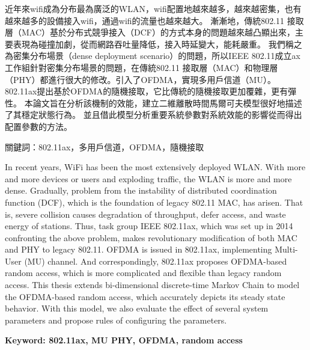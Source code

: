 \begin{abstractzh}
近年來wifi成為分布最為廣泛的WLAN，wifi配置地越來越多，越來越密集，也有越來越多的設備接入wifi，通過wifi的流量也越來越大。
漸漸地，傳統802.11 接取層（MAC）基於分布式競爭接入（DCF）的方式本身的問題越來越凸顯出來，主要表現為碰撞加劇，從而網路吞吐量降低，接入時延變大，能耗嚴重。
我們稱之為密集分布場景（dense deployment scenario）的問題，所以IEEE 802.11成立ax工作組針對密集分布場景的問題，在傳統802.11 接取層（MAC）和物理層（PHY）都進行很大的修改。引入了OFDMA，實現多用戶信道（MU）。
802.11ax提出基於OFDMA的隨機接取，它比傳統的隨機接取更加覆雜，更有彈性。
本論文旨在分析該機制的效能，建立二維離散時間馬爾可夫模型很好地描述了其穩定狀態行為。
並且借此模型分析重要系統參數對系統效能的影響從而得出配置參數的方法。

\noindent
關鍵詞：802.11ax，多用戶信道，OFDMA，隨機接取
\end{abstractzh}

\begin{abstracten}
In recent years, WiFi has been the most extensively deployed WLAN. 
With more and more devices or users and exploding traffic, the WLAN is more and more dense. 
Gradually, problem from the instability of distributed coordination function (DCF), which is the foundation of legacy 802.11 MAC, has arisen. 
That is, severe collision causes degradation of throughput, defer access, and waste energy of stations. 
Thus, task group IEEE 802.11ax, which was set up in 2014 confronting the above problem, makes revolutionary modification of both MAC and PHY to legacy 802.11. 
OFDMA is issued in 802.11ax, implementing Multi-User (MU) channel. 
And correspondingly, 802.11ax proposes OFDMA-based random access, which is more complicated and flexible than legacy random access. 
This thesis extends bi-dimensional discrete-time Markov Chain to model the OFDMA-based random access, which accurately depicts its steady state behavior. 
With this model, we also evaluate the effect of several system parameters and propose rules of configuring the parameters.



\noindent
\textbf{Keyword: 802.11ax, MU PHY, OFDMA, random access}
\end{abstracten}

\begin{comment}
\category{I2.10}{Computing Methodologies}{Artificial Intelligence --
Vision and Scene Understanding} \category{H5.3}{Information
Systems}{Information Interfaces and Presentation (HCI) -- Web-based
Interaction.}

\terms{Design, Human factors, Performance.}

\keywords{802.11ax, MU PHY, OFDMA, random access}
\end{comment}
